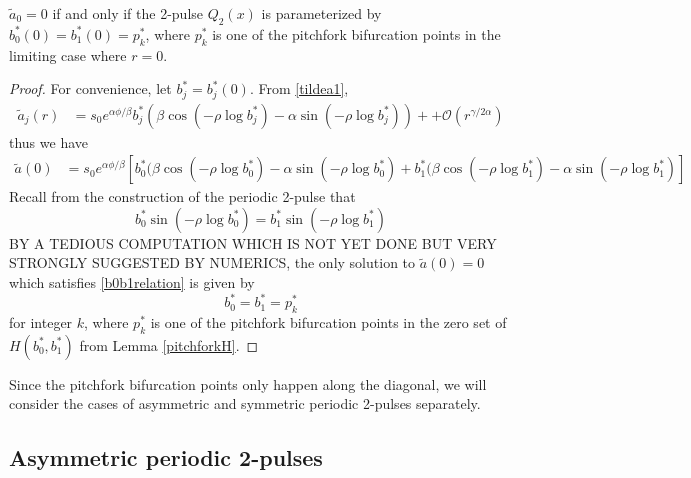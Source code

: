 \documentclass[thesis.tex]{subfiles}
\begin{document}
\begin{lemma}\label{lemma:tildea0zero}
$\tilde{a}_0 = 0$ if and only if the 2-pulse $Q_2(x)$ is parameterized by $b^*_0(0) = b^*_1(0) = p_k^*$, where $p_k^*$ is one of the pitchfork bifurcation points in the limiting case where $r = 0$.
\begin{proof}
For convenience, let $b^*_j = b^*_j(0)$. From \cref{tildea1},
\begin{align}\label{tildear}
\tilde{a}_j(r) &= s_0 e^{\alpha \phi/\beta} b^*_j \left( \beta \cos\left(-\rho \log b^*_j \right) - \alpha \sin \left(-\rho \log b^*_j \right) \right) + + \mathcal{O}(r^{\gamma/2\alpha})
\end{align}
thus we have
\begin{align}\label{tildea0}
\tilde{a}(0) &= s_0 e^{\alpha \phi/\beta}\left[ b^*_0 ( \beta \cos(-\rho \log b^*_0 ) - \alpha \sin (-\rho \log b^*_0 )  + b^*_1 ( \beta \cos(-\rho \log b^*_1 ) - \alpha \sin (-\rho \log b^*_1 ) \right]
\end{align}
Recall from the construction of the periodic 2-pulse that
\begin{equation}\label{b0b1relation}
b^*_0 \sin (-\rho \log b^*_0) = b^*_1 \sin(-\rho \log b^*_1)
\end{equation}
BY A TEDIOUS COMPUTATION WHICH IS NOT YET DONE BUT VERY STRONGLY SUGGESTED BY NUMERICS, the only solution to $\tilde{a}(0) = 0$ which satisfies \cref{b0b1relation} is given by 
\[
b_0^* = b_1^* = p_k^*
\]
for integer $k$, where $p_k^*$ is one of the pitchfork bifurcation points in the zero set of $H(b^*_0, b^*_1)$ from Lemma \ref{pitchforkH}.
\end{proof}
\end{lemma}

Since the pitchfork bifurcation points only happen along the diagonal, we will consider the cases of asymmetric and symmetric periodic 2-pulses separately.

\subsection{Asymmetric periodic 2-pulses}
\end{document}
